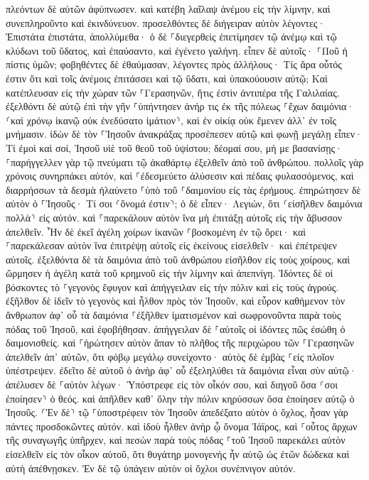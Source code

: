 \documentclass[twoside, 9pt]{extreport}
\begin{document}
πλεόντων δὲ αὐτῶν ἀφύπνωσεν. καὶ κατέβη λαῖλαψ ἀνέμου εἰς τὴν λίμνην, καὶ συνεπληροῦντο καὶ ἐκινδύνευον. 
προσελθόντες δὲ διήγειραν αὐτὸν λέγοντες· Ἐπιστάτα ἐπιστάτα, ἀπολλύμεθα· ὁ δὲ ⸀διεγερθεὶς ἐπετίμησεν τῷ ἀνέμῳ καὶ τῷ κλύδωνι τοῦ ὕδατος, καὶ ἐπαύσαντο, καὶ ἐγένετο γαλήνη. 
εἶπεν δὲ αὐτοῖς· ⸀Ποῦ ἡ πίστις ὑμῶν; φοβηθέντες δὲ ἐθαύμασαν, λέγοντες πρὸς ἀλλήλους· Τίς ἄρα οὗτός ἐστιν ὅτι καὶ τοῖς ἀνέμοις ἐπιτάσσει καὶ τῷ ὕδατι, καὶ ὑπακούουσιν αὐτῷ; 
Καὶ κατέπλευσαν εἰς τὴν χώραν τῶν ⸀Γερασηνῶν, ἥτις ἐστὶν ἀντιπέρα τῆς Γαλιλαίας. 
ἐξελθόντι δὲ αὐτῷ ἐπὶ τὴν γῆν ⸀ὑπήντησεν ἀνήρ τις ἐκ τῆς πόλεως ⸀ἔχων δαιμόνια· ⸂καὶ χρόνῳ ἱκανῷ οὐκ ἐνεδύσατο ἱμάτιον⸃, καὶ ἐν οἰκίᾳ οὐκ ἔμενεν ἀλλ᾽ ἐν τοῖς μνήμασιν. 
ἰδὼν δὲ τὸν ⸀Ἰησοῦν ἀνακράξας προσέπεσεν αὐτῷ καὶ φωνῇ μεγάλῃ εἶπεν· Τί ἐμοὶ καὶ σοί, Ἰησοῦ υἱὲ τοῦ θεοῦ τοῦ ὑψίστου; δέομαί σου, μή με βασανίσῃς· 
⸀παρήγγελλεν γὰρ τῷ πνεύματι τῷ ἀκαθάρτῳ ἐξελθεῖν ἀπὸ τοῦ ἀνθρώπου. πολλοῖς γὰρ χρόνοις συνηρπάκει αὐτόν, καὶ ⸀ἐδεσμεύετο ἁλύσεσιν καὶ πέδαις φυλασσόμενος, καὶ διαρρήσσων τὰ δεσμὰ ἠλαύνετο ⸀ὑπὸ τοῦ ⸀δαιμονίου εἰς τὰς ἐρήμους. 
ἐπηρώτησεν δὲ αὐτὸν ὁ ⸀Ἰησοῦς· Τί σοι ⸂ὄνομά ἐστιν⸃; ὁ δὲ εἶπεν· Λεγιών, ὅτι ⸂εἰσῆλθεν δαιμόνια πολλὰ⸃ εἰς αὐτόν. 
καὶ ⸀παρεκάλουν αὐτὸν ἵνα μὴ ἐπιτάξῃ αὐτοῖς εἰς τὴν ἄβυσσον ἀπελθεῖν. 
Ἦν δὲ ἐκεῖ ἀγέλη χοίρων ἱκανῶν ⸀βοσκομένη ἐν τῷ ὄρει· καὶ ⸀παρεκάλεσαν αὐτὸν ἵνα ἐπιτρέψῃ αὐτοῖς εἰς ἐκείνους εἰσελθεῖν· καὶ ἐπέτρεψεν αὐτοῖς. 
ἐξελθόντα δὲ τὰ δαιμόνια ἀπὸ τοῦ ἀνθρώπου εἰσῆλθον εἰς τοὺς χοίρους, καὶ ὥρμησεν ἡ ἀγέλη κατὰ τοῦ κρημνοῦ εἰς τὴν λίμνην καὶ ἀπεπνίγη. 
Ἰδόντες δὲ οἱ βόσκοντες τὸ ⸀γεγονὸς ἔφυγον καὶ ἀπήγγειλαν εἰς τὴν πόλιν καὶ εἰς τοὺς ἀγρούς. 
ἐξῆλθον δὲ ἰδεῖν τὸ γεγονὸς καὶ ἦλθον πρὸς τὸν Ἰησοῦν, καὶ εὗρον καθήμενον τὸν ἄνθρωπον ἀφ᾽ οὗ τὰ δαιμόνια ⸀ἐξῆλθεν ἱματισμένον καὶ σωφρονοῦντα παρὰ τοὺς πόδας τοῦ Ἰησοῦ, καὶ ἐφοβήθησαν. 
ἀπήγγειλαν δὲ ⸀αὐτοῖς οἱ ἰδόντες πῶς ἐσώθη ὁ δαιμονισθείς. 
καὶ ⸀ἠρώτησεν αὐτὸν ἅπαν τὸ πλῆθος τῆς περιχώρου τῶν ⸀Γερασηνῶν ἀπελθεῖν ἀπ᾽ αὐτῶν, ὅτι φόβῳ μεγάλῳ συνείχοντο· αὐτὸς δὲ ἐμβὰς ⸀εἰς πλοῖον ὑπέστρεψεν. 
ἐδεῖτο δὲ αὐτοῦ ὁ ἀνὴρ ἀφ᾽ οὗ ἐξεληλύθει τὰ δαιμόνια εἶναι σὺν αὐτῷ· ἀπέλυσεν δὲ ⸀αὐτὸν λέγων· 
Ὑπόστρεφε εἰς τὸν οἶκόν σου, καὶ διηγοῦ ὅσα ⸂σοι ἐποίησεν⸃ ὁ θεός. καὶ ἀπῆλθεν καθ᾽ ὅλην τὴν πόλιν κηρύσσων ὅσα ἐποίησεν αὐτῷ ὁ Ἰησοῦς. 
⸂Ἐν δὲ⸃ τῷ ⸀ὑποστρέφειν τὸν Ἰησοῦν ἀπεδέξατο αὐτὸν ὁ ὄχλος, ἦσαν γὰρ πάντες προσδοκῶντες αὐτόν. 
καὶ ἰδοὺ ἦλθεν ἀνὴρ ᾧ ὄνομα Ἰάϊρος, καὶ ⸀οὗτος ἄρχων τῆς συναγωγῆς ὑπῆρχεν, καὶ πεσὼν παρὰ τοὺς πόδας ⸀τοῦ Ἰησοῦ παρεκάλει αὐτὸν εἰσελθεῖν εἰς τὸν οἶκον αὐτοῦ, 
ὅτι θυγάτηρ μονογενὴς ἦν αὐτῷ ὡς ἐτῶν δώδεκα καὶ αὐτὴ ἀπέθνῃσκεν. Ἐν δὲ τῷ ὑπάγειν αὐτὸν οἱ ὄχλοι συνέπνιγον αὐτόν. 
\end{document}
